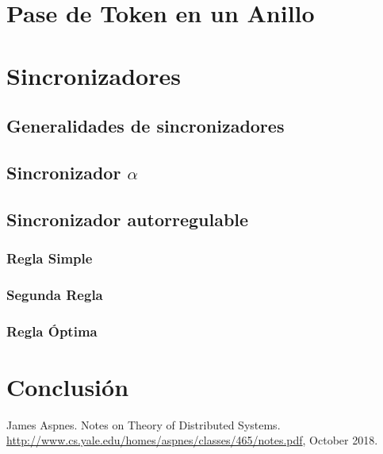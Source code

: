 \documentclass[12pt,a4paper]{article}
\begin{document}
\section{Pase de Token en un Anillo}{}
\section{Sincronizadores}{
\subsection{Generalidades de sincronizadores}{}

\subsection{Sincronizador $\alpha$}{}

\subsection{Sincronizador autorregulable}{}

    \subsubsection{Regla Simple}{}

    \subsubsection{Segunda Regla}{}

    \subsubsection{Regla Óptima}{}
}
\section{Conclusión}{}

\begin{thebibliography}{}

James Aspnes. Notes on Theory of Distributed Systems.
\href{http://www.cs.yale.edu/homes/aspnes/classes/465/notes.pdf}
{http://www.cs.yale.edu/homes/aspnes/classes/465/notes.pdf}, October 2018.

\end{thebibliography}
\end{document}
